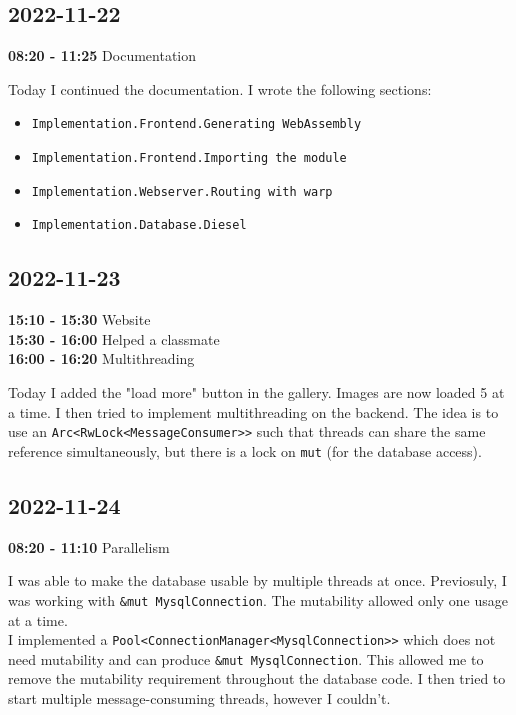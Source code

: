 \documentclass{article}
\begin{document}
\subsection{2022-11-22}

\textbf{08:20 - 11:25} Documentation

Today I continued the documentation.
I wrote the following sections:
\begin{itemize}
    \item \texttt{Implementation.Frontend.Generating WebAssembly}
    \item \texttt{Implementation.Frontend.Importing the module}
    \item \texttt{Implementation.Webserver.Routing with warp}
    \item \texttt{Implementation.Database.Diesel}
\end{itemize}

\subsection{2022-11-23}

\textbf{15:10 - 15:30} Website \\
\textbf{15:30 - 16:00} Helped a classmate \\
\textbf{16:00 - 16:20} Multithreading

Today I added the "load more" button in the gallery.
Images are now loaded 5 at a time.
I then tried to implement multithreading on the backend.
The idea is to use an \texttt{Arc<RwLock<MessageConsumer>>} such that
threads can share the same reference simultaneously, but there
is a lock on \texttt{mut} (for the database access).

\subsection{2022-11-24}

\textbf{08:20 - 11:10} Parallelism

I was able to make the database usable by multiple threads at once.
Previosuly, I was working with \texttt{\&mut MysqlConnection}.
The mutability allowed only one usage at a time. \\
I implemented a \texttt{Pool<ConnectionManager<MysqlConnection>>} which does not
need mutability and can produce \texttt{\&mut MysqlConnection}.
This allowed me to remove the mutability requirement throughout the database
code. I then tried to start multiple message-consuming threads, however I
couldn't.
\end{document}
